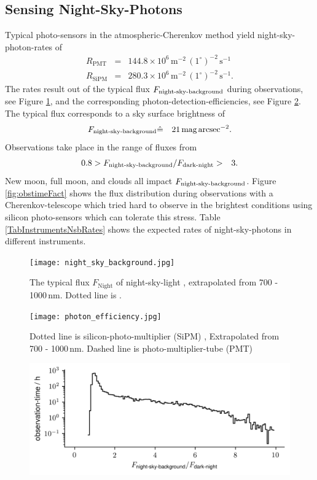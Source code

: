 \documentclass{article}%
\begin{document}
\begin{multicols}{2}
\section*{Sensing Night-Sky-Photons}%
\label{sec:nsb}%
%
Typical photo-sensors in the atmospheric-Cherenkov method yield night-sky-photon-rates of
\begin{eqnarray*}
R_\text{PMT} &=& 144.8\times10^6\,\text{m}^{-2}\,(1^\circ)^{-2}\,\text{s}^{-1}\\
R_\text{SiPM} &=& 280.3\times10^6\,\text{m}^{-2}\,(1^\circ)^{-2}\,\text{s}^{-1}.
\end{eqnarray*}
%
The rates result out of the typical flux $F_\text{night-sky-background}{}$ during observations, see Figure \ref{fig:nsb}, and the corresponding photon-detection-efficiencies, see Figure \ref{fig:pde}.
%
The typical flux  corresponds to a sky surface brightness of
%
\begin{eqnarray*}
F_\text{night-sky-background}{} &\hat{=}& 21\,\text{mag}\,\text{arcsec}^{-2}.
\end{eqnarray*}
%
Observations take place in the range of fluxes from
\begin{eqnarray*}
0.8 &> F_\text{night-sky-background}{} / F_\text{dark-night}{} >& 3.
\end{eqnarray*}
%
New moon, full moon, and clouds all impact $F_\text{night-sky-background}{}$.
%
Figure \ref{fig:obstimeFact} shows the flux distribution during observations with a Cherenkov-telescope which tried hard to observe in the brightest conditions using silicon photo-sensors which can tolerate this stress.
%
Table \ref{TabInstrumentsNsbRates} shows the expected rates of night-sky-photons in different instruments.
%
\begin{figure}[H]%
\centering%
\texttt{[image: night\_sky\_background.jpg]}%
\caption{
The typical flux $F_\text{Night}$ of night-sky-light \cite{gaug2013night},
extrapolated from 700 - 1000\,nm. Dotted line is \cite{preuss2002study}.
}%
\label{fig:nsb}
\end{figure}
%
\begin{figure}[H]%
\centering%
\texttt{[image: photon\_efficiency.jpg]}%
\caption{
Dotted line is silicon-photo-multiplier (SiPM) \cite{hamamatsu2009mppc},
Extrapolated from 700 - 1000\,nm.
Dashed line is photo-multiplier-tube (PMT) \cite{toyama2013novel}
}%
\label{fig:pde}
\end{figure}
%
\begin{figure}[H]%
\centering%
\includegraphics[width=1.0\linewidth]{observation_time_histogram.png}%

\end{figure}
\end{multicols}
\end{document}
